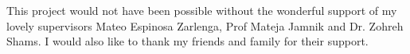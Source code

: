 \documentclass[12pt,a4paper,twoside]{report}
\begin{document}
This project would not have been possible without the wonderful
support of my lovely supervisors Mateo Espinosa Zarlenga, Prof Mateja Jamnik and Dr. Zohreh Shams. I would also like to 
thank my friends and family for their support.

\fi
\cleardoublepage %

\tableofcontents
\listoffigures
\listoftables



\pagestyle{headings}
\label{lastcontentpage}







\label{lastpage}

\end{document}
